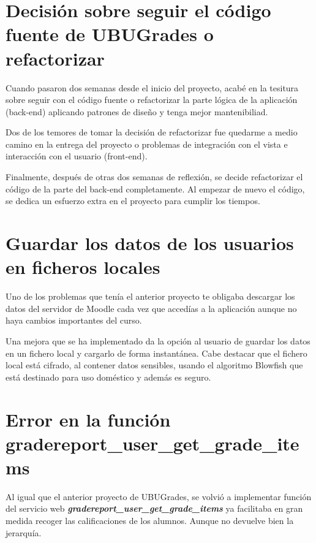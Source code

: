 \section{Decisión sobre seguir el código fuente de UBUGrades o refactorizar}

Cuando pasaron dos semanas desde el inicio del proyecto, acabé en la tesitura sobre seguir con el código fuente o refactorizar la parte lógica de la aplicación (back-end) aplicando patrones de diseño y tenga mejor mantenibiliad. 

Dos de los temores de tomar la decisión de refactorizar fue quedarme a medio camino en la entrega del proyecto o problemas de integración con el vista e interacción con el usuario (front-end).

Finalmente, después de otras dos semanas de reflexión, se decide refactorizar el código de la parte del back-end completamente. Al empezar de nuevo el código,  se dedica un esfuerzo extra en el proyecto para cumplir los tiempos.

\section{Guardar los datos de los usuarios en ficheros locales}

Uno de los problemas que tenía el anterior proyecto te obligaba descargar los datos del servidor de Moodle cada vez que accedías a la aplicación aunque no haya cambios importantes del curso.

Una mejora que se ha implementado da la opción al usuario de guardar los datos en un fichero local y cargarlo de forma instantánea. Cabe destacar que el fichero local está cifrado, al contener datos sensibles, usando el algoritmo Blowfish\cite{noauthor_schneier_nodate} que está destinado para uso doméstico y además es seguro.


\section{Error en la función gradereport\_user\_get\_grade\_items}

Al igual que el anterior proyecto de UBUGrades, se volvió a implementar función del servicio web \textbf{\textit{gradereport\_user\_get\_grade\_items}} ya facilitaba en gran medida recoger las calificaciones de los alumnos. Aunque no devuelve bien la jerarquía.


